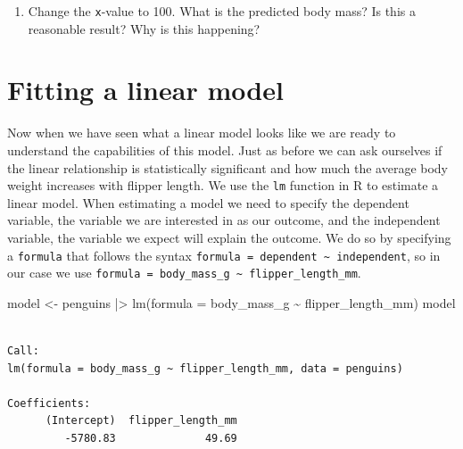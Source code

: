 \documentclass[
  letterpaper,
  DIV=11,
  numbers=noendperiod]{scrreprt}
\newenvironment{Shaded}{\begin{snugshade}}{\end{snugshade}}
\newcommand{\AttributeTok}[1]{\textcolor[rgb]{0.40,0.45,0.13}{#1}}
\newcommand{\FunctionTok}[1]{\textcolor[rgb]{0.28,0.35,0.67}{#1}}
\newcommand{\NormalTok}[1]{\textcolor[rgb]{0.00,0.23,0.31}{#1}}
\newcommand{\OtherTok}[1]{\textcolor[rgb]{0.00,0.23,0.31}{#1}}
\newcommand{\SpecialCharTok}[1]{\textcolor[rgb]{0.37,0.37,0.37}{#1}}
\providecommand{\tightlist}{%
  \setlength{\itemsep}{0pt}\setlength{\parskip}{0pt}}\usepackage{longtable,booktabs,array}
\begin{document}
\begin{enumerate}
\def\labelenumi{\arabic{enumi}.}
\setcounter{enumi}{1}
\tightlist
\item
  Change the \texttt{x}-value to 100. What is the predicted body mass?
  Is this a reasonable result? Why is this happening?
\end{enumerate}

\section{Fitting a linear model}\label{fitting-a-linear-model}

Now when we have seen what a linear model looks like we are ready to
understand the capabilities of this model. Just as before we can ask
ourselves if the linear relationship is statistically significant and
how much the average body weight increases with flipper length. We use
the \texttt{lm} function in R to estimate a linear model. When
estimating a model we need to specify the dependent variable, the
variable we are interested in as our outcome, and the independent
variable, the variable we expect will explain the outcome. We do so by
specifying a \texttt{formula} that follows the syntax
\texttt{formula\ =\ dependent\ \textasciitilde{}\ independent}, so in
our case we use
\texttt{formula\ =\ body\_mass\_g\ \textasciitilde{}\ flipper\_length\_mm}.

\begin{Shaded}
\begin{Highlighting}[]
\NormalTok{model }\OtherTok{\textless{}{-}}\NormalTok{ penguins }\SpecialCharTok{|\textgreater{}} 
  \FunctionTok{lm}\NormalTok{(}\AttributeTok{formula =}\NormalTok{ body\_mass\_g }\SpecialCharTok{\textasciitilde{}}\NormalTok{ flipper\_length\_mm)}
\NormalTok{model}
\end{Highlighting}
\end{Shaded}

\begin{verbatim}

Call:
lm(formula = body_mass_g ~ flipper_length_mm, data = penguins)

Coefficients:
      (Intercept)  flipper_length_mm  
         -5780.83              49.69  
\end{verbatim}
\end{document}
